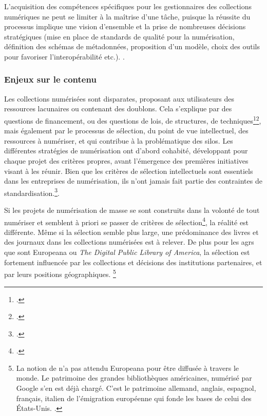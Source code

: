 
L'acquisition des compétences spécifiques pour les gestionnaires des collections numériques ne peut se limiter à la maîtrise d'une tâche, puisque la réussite du processus implique une vision d'ensemble et la prise de nombreuses décisions stratégiques (mise en place de standards de qualité pour la numérisation, définition des schémas de métadonnées, proposition d'un modèle, choix des outils pour favoriser l'interopérabilité etc.). . 

\subsubsection{Enjeux sur le contenu}

Les collections numérisées sont disparates, proposant aux utilisateurs des ressources lacunaires ou contenant des doublons. Cela s'explique par des questions de financement, ou des questions de lois, de structures, de techniques\footcite{xie_discover_2016}\footcite{lopatin_library_2006}, mais également par le processus de sélection, du point de vue intellectuel, des ressources à numériser, et qui contribue à la problématique des silos. Les différentes stratégies de numérisation ont d'abord cohabité, développant pour chaque projet des critères propres, avant l'émergence des premières initiatives visant à les réunir. Bien que les critères de sélection intellectuels sont essentiels dans les entreprises de numérisation, ils n'ont jamais fait partie des contraintes de standardisation.\footcite{coutts_stepping_2017}.

Si les projets de numérisation de masse se sont construits dans la volonté de tout numériser et semblent à priori se passer de critères de sélection\footcite{lampert_ramping_2018}, la réalité est différente. Même si la sélection semble plus large, une prédominance des livres et des journaux dans les collections numérisées est à relever. De plus pour les \gls{agr}s que sont Europeana ou \textit{The Digital Public Library of America}, la sélection est fortement influencée par les collections et décisions des institutions partenaires, et par leurs positions géographiques. \footnote{La notion de  n'a pas attendu Europeana pour être diffusée à travers le monde. Le patrimoine des grandes bibliothèques américaines, numérisé par Google s'en est déjà chargé. C'est le patrimoine allemand, anglais, espagnol, français, italien de l'émigration européenne qui fonde les bases de celui des États-Unis. \cite{moatti_bibliotheque_2012}.} 

